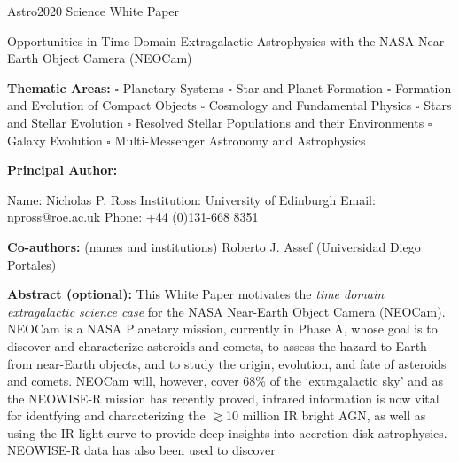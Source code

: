 \documentclass[12pt]{article}
\begin{document}
\raggedright
\huge
Astro2020 Science White Paper \linebreak

Opportunities in Time-Domain Extragalactic Astrophysics with the NASA
Near-Earth Object Camera (NEOCam)
\linebreak
\normalsize

\noindent \textbf{Thematic Areas:} 
\hspace*{60pt} $\square$ Planetary Systems 
\hspace*{10pt} $\square$ Star and Planet Formation 
\hspace*{20pt} 
\linebreak
$\square$ Formation and Evolution of Compact Objects 
\hspace*{31pt} $\square$ Cosmology and Fundamental Physics 
\linebreak
  $\square$  Stars and Stellar Evolution \hspace*{1pt} 
 $\square$ Resolved Stellar Populations and their Environments \hspace*{40pt} 
\linebreak
  $\square$    Galaxy Evolution   \hspace*{45pt} $\square$             
Multi-Messenger Astronomy and Astrophysics \hspace*{65pt} \linebreak
  
\textbf{Principal Author:}

Name: Nicholas P. Ross	
 \linebreak						
Institution:  University of Edinburgh
 \linebreak
Email: npross@roe.ac.uk
 \linebreak
Phone:  +44 (0)131-668 8351
 \linebreak
 
\textbf{Co-authors:} (names and institutions)
  \linebreak
Roberto J. Assef (Universidad Diego Portales)   \linebreak


\textbf{Abstract  (optional):}
This White Paper motivates the {\it time domain extragalactic science
case} for the NASA Near-Earth Object Camera (NEOCam).
NEOCam is a NASA Planetary mission, currently in Phase A, whose goal is to
discover and characterize asteroids and comets, to assess the hazard
to Earth from near-Earth objects, and to study the origin, evolution,
and fate of asteroids and comets.
NEOCam will, however, cover 68\% of the `extragalactic sky'
and as the NEOWISE-R mission has recently proved,
infrared information is now vital for identfying and characterizing
the $\gtrsim$10 million IR bright AGN, as well as using the IR light
curve to provide deep insights into accretion disk astrophysics.
NEOWISE-R data has also been used to discover 
\end{document}
